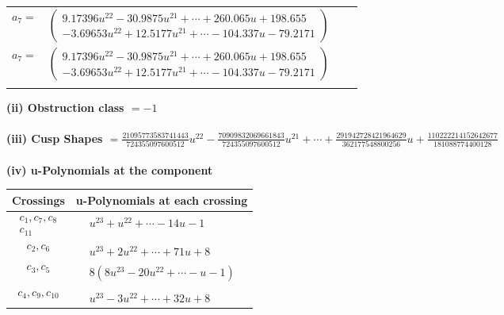 \documentclass[1p]{elsarticle_modified}
\theoremstyle{definition}
\begin{document}
\begin{tabular}{m{7pt} m{180pt} m{7pt} m{180pt} }
\flushright $a_{7}=$&$\begin{pmatrix}9.17396 u^{22}-30.9875 u^{21}+\cdots+260.065 u+198.655\\-3.69653 u^{22}+12.5177 u^{21}+\cdots-104.337 u-79.2171\end{pmatrix}$\\ \flushright $a_{7}=$&$\begin{pmatrix}9.17396 u^{22}-30.9875 u^{21}+\cdots+260.065 u+198.655\\-3.69653 u^{22}+12.5177 u^{21}+\cdots-104.337 u-79.2171\end{pmatrix}$\\&\end{tabular}
\flushleft \textbf{(ii) Obstruction class $= -1$}\\~\\
\flushleft \textbf{(iii) Cusp Shapes $= \frac{21095773583741443}{724355097600512} u^{22}-\frac{70909832069661843}{724355097600512} u^{21}+\cdots+\frac{291942728421964629}{362177548800256} u+\frac{110222214152642677}{181088774400128}$}\\~\\
\newpage\renewcommand{\arraystretch}{1}
\flushleft \textbf{(iv) u-Polynomials at the component}\newline \\
\begin{tabular}{m{50pt}|m{274pt}}
Crossings & \hspace{64pt}u-Polynomials at each crossing \\
\hline $$\begin{aligned}c_{1},c_{7},c_{8}\\c_{11}\end{aligned}$$&$\begin{aligned}
&u^{23}+u^{22}+\cdots-14 u-1
\end{aligned}$\\
\hline $$\begin{aligned}c_{2},c_{6}\end{aligned}$$&$\begin{aligned}
&u^{23}+2 u^{22}+\cdots+71 u+8
\end{aligned}$\\
\hline $$\begin{aligned}c_{3},c_{5}\end{aligned}$$&$\begin{aligned}
&8(8 u^{23}-20 u^{22}+\cdots- u-1)
\end{aligned}$\\
\hline $$\begin{aligned}c_{4},c_{9},c_{10}\end{aligned}$$&$\begin{aligned}
&u^{23}-3 u^{22}+\cdots+32 u+8
\end{aligned}$\\
\hline
\end{tabular}\\~\\
\end{document}
